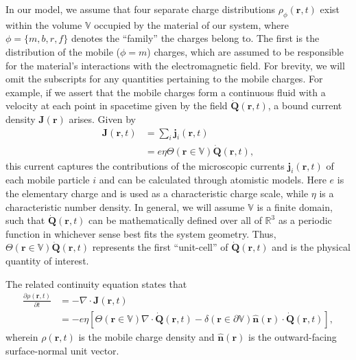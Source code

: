 \documentclass{article}
\begin{document}
In our model, we assume that four separate charge distributions $\rho_\phi(\mathbf{r},t)$ exist within the volume $\mathbb{V}$ occupied by the material of our system, where $\phi = \{m,b,r,f\}$ denotes the ``family'' the charges belong to. The first is the distribution of the mobile ($\phi = m$) charges, which are assumed to be responsible for the material's interactions with the electromagnetic field. For brevity, we will omit the subscripts for any quantities pertaining to the mobile charges. For example, if we assert that the mobile charges form a continuous fluid with a velocity at each point in spacetime given by the field $\dot{\mathbf{Q}}(\mathbf{r},t)$, a bound current density $\mathbf{J}(\mathbf{r})$ arises. Given by
\begin{equation}
\begin{split}
\mathbf{J}(\mathbf{r},t) &= \sum_i\mathbf{j}_i(\mathbf{r},t)\\
&= e\eta\Theta(\mathbf{r}\in\mathbb{V})\dot{\mathbf{Q}}(\mathbf{r},t),
\end{split}
\end{equation}
this current captures the contributions of the microscopic currents $\mathbf{j}_i(\mathbf{r},t)$ of each mobile particle $i$ and can be calculated through atomistic models. Here $e$ is the elementary charge and is used as a characteristic charge scale, while $\eta$ is a characteristic number density. In general, we will assume $\mathbb{V}$ is a finite domain, such that $\dot{\mathbf{Q}}(\mathbf{r},t)$ can be mathematically defined over all of $\mathbb{R}^3$ as a periodic function in whichever sense best fits the system geometry. Thus, $\Theta(\mathbf{r}\in\mathbb{V})\dot{\mathbf{Q}}(\mathbf{r},t)$ represents the first ``unit-cell'' of $\dot{\mathbf{Q}}(\mathbf{r},t)$ and is the physical quantity of interest. 


The related continuity equation states that
\begin{equation}
\begin{split}
\frac{\partial \rho(\mathbf{r},t)}{\partial t} 
&= -\nabla\cdot\mathbf{J}(\mathbf{r},t)\\
&= -e\eta\left[\Theta(\mathbf{r}\in\mathbb{V})\nabla\cdot\dot{\mathbf{Q}}(\mathbf{r},t) - \delta(\mathbf{r}\in\partial\mathbb{V})\hat{\mathbf{n}}(\mathbf{r})\cdot\dot{\mathbf{Q}}(\mathbf{r},t)\right],
\end{split}
\end{equation}
wherein $\rho(\mathbf{r},t)$ is the mobile charge density and $\hat{\mathbf{n}}(\mathbf{r})$ is the outward-facing surface-normal unit vector.
\end{document}
